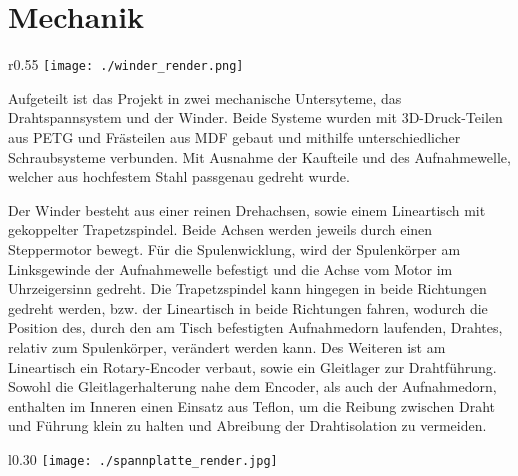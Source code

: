\section{Mechanik}
\label{sec:Mechanik}




\begin{wrapfigure}{r}{0.55\textwidth}
    \centering
    \texttt{[image: ./winder\_render.png]}
\end{wrapfigure}

Aufgeteilt ist das Projekt in zwei mechanische Untersyteme, das Drahtspannsystem und der Winder.
Beide Systeme wurden mit 3D-Druck-Teilen aus PETG und Frästeilen aus MDF gebaut und mithilfe unterschiedlicher Schraubsysteme verbunden. Mit Ausnahme der Kaufteile und des Aufnahmewelle, welcher aus hochfestem Stahl passgenau gedreht wurde.



Der Winder besteht aus einer reinen Drehachsen, sowie einem Lineartisch mit gekoppelter Trapetzspindel. Beide Achsen werden jeweils durch einen Steppermotor bewegt. Für die Spulenwicklung, wird der Spulenkörper am Linksgewinde der Aufnahmewelle befestigt und die Achse vom Motor im Uhrzeigersinn gedreht. Die Trapetzspindel kann hingegen in beide Richtungen gedreht werden, bzw. der Lineartisch in beide Richtungen fahren, wodurch die Position des, durch den am Tisch befestigten Aufnahmedorn laufenden, Drahtes, relativ zum Spulenkörper, verändert werden kann. Des Weiteren ist am Lineartisch ein Rotary-Encoder verbaut, sowie ein Gleitlager zur Drahtführung. Sowohl die Gleitlagerhalterung nahe dem Encoder, als auch der Aufnahmedorn, enthalten im Inneren einen Einsatz aus Teflon, um die Reibung zwischen Draht und Führung klein zu halten und Abreibung der Drahtisolation zu vermeiden.


\begin{wrapfigure}{l}{0.30\textwidth}
    \centering
    \texttt{[image: ./spannplatte\_render.jpg]}
\end{wrapfigure}

